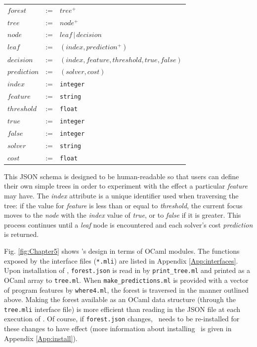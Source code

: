 \begin{tabularx}{0.8\textwidth}{@{}ZcY@{}}
	$forest$ &:=&  $tree^+$ \\
	$tree$ &:=& $node^+$ \\
	$node$ &:=& $leaf\,|\, decision$ \\
	$leaf$ &:=& $(index, prediction^+)$ \\
	$decision$ &:=& $(index, feature, threshold, true, false)$ \\
	$prediction$ &:=& $(solver, cost)$ \\
	$index$ &:=& \texttt{integer} \\
	$feature$ &:=& \texttt{string} \\
	$threshold$ &:=& \texttt{float} \\
	$true$ &:=& \texttt{integer} \\
	$false$ &:=& \texttt{integer} \\
	$solver$ &:=& \texttt{string} \\
	$cost$ &:=& \texttt{float} \\	
\end{tabularx}

This JSON schema is designed to be human-readable so that users can define their own simple trees in order to experiment with the effect a particular \textit{feature} may have.
The \textit{index} attribute is a unique identifier used when traversing the tree: if the value for \textit{feature} is less than or equal to \textit{threshold}, the current focus moves to the \textit{node} with the \textit{index} value of \textit{true}, or to \textit{false} if it is greater.
This process continues until a \textit{leaf} node is encountered and each solver's cost \textit{prediction} is returned.

Fig. \ref{fig:Chapter5} shows \where's design in terms of OCaml modules.
The functions exposed by the interface files (\texttt{*.mli}) are listed in Appendix \ref{App:interfaces}. 
Upon installation of \where, \texttt{forest.json} is read in by \texttt{print\_tree.ml} and printed as a OCaml array to \texttt{tree.ml}.
When \texttt{make\_predictions.ml} is provided with a vector of program features by \texttt{where4.ml}, the forest is traversed  in the manner outlined above.
Making the forest available as an OCaml data structure (through the \texttt{tree.mli} interface file) is more efficient than reading in the JSON file at each execution of \where.
Of course, if \texttt{forest.json} changes, \where~needs to be re-installed for these changes to have effect (more information about installing \where~is given in Appendix \ref{App:install}).  


